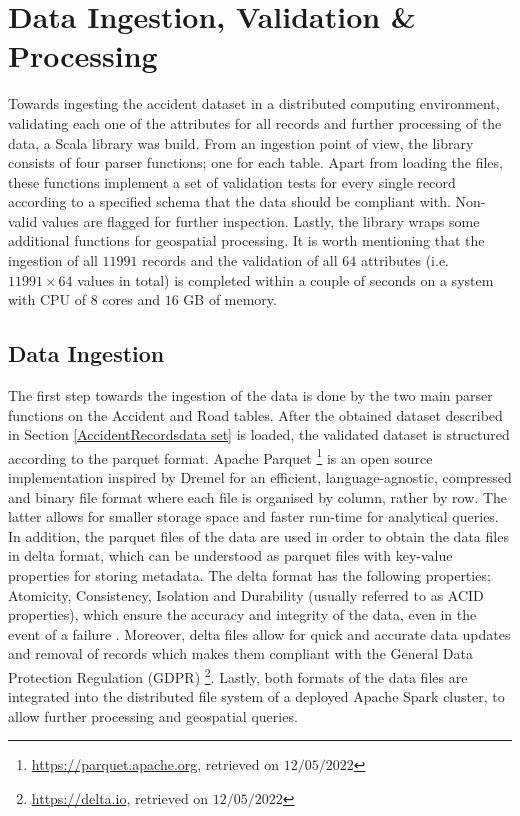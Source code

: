 \documentclass[12pt]{article}
\theoremstyle{definition}
\begin{document}
\section{Data Ingestion, Validation \& Processing}\label{ingestion}
Towards ingesting the accident dataset in a distributed computing environment, validating each one of the attributes for all records and further processing of the data, a Scala library was build. From an ingestion point of view, the library consists of four parser functions; one for each table. Apart from loading the files, these functions implement a set of validation tests for every single record according to a specified schema that the data should be compliant with. Non-valid values are flagged for further inspection. Lastly, the library wraps some additional functions for geospatial processing. It is worth mentioning that the ingestion of all $11991$ records and the validation of all $64$ attributes (i.e. $11991\times 64$ values in total) is completed within a couple of seconds on a system with CPU of $8$ cores and $16$ GB of memory.  
\subsection{Data Ingestion}
The first step towards the ingestion of the data is done by the two main parser functions on the Accident and Road tables. After the obtained dataset described in Section \ref{AccidentRecordsdata set} is loaded, the validated dataset is structured according to the parquet format. Apache Parquet \footnote{\url{https://parquet.apache.org}, retrieved on $12/05/2022$
} is an open source implementation inspired by Dremel \cite{dremelPaper} for an efficient, language-agnostic, compressed and binary file format where each file is organised by column, rather by row. The latter allows for smaller storage space and faster run-time for analytical queries. In addition, the parquet files of the data are used in order to obtain the data files in delta format, which can be understood as parquet files with key-value properties for storing metadata. The delta format has the following properties; Atomicity, Consistency, Isolation and Durability (usually referred to as ACID properties), which ensure the accuracy and integrity of the data, even in the event of a failure \cite{deltaPaper}. Moreover, delta files allow for quick and accurate data updates and removal of records which makes them compliant with the General Data Protection Regulation (GDPR) \footnote{\url{https://delta.io}, retrieved on $12/05/2022$}. Lastly, both formats of the data files are integrated into the distributed file system of a deployed Apache Spark cluster, to allow further processing and geospatial queries.  
\end{document}
